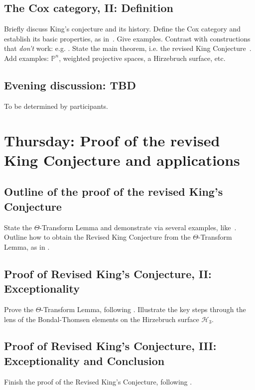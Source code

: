 \documentclass[11pt]{amsart}
\numberwithin{equation}{section}
\theoremstyle{definition}
\theoremstyle{remark}
\newcommand{\PP}{\mathbb P}
\begin{document}
\subsection{The Cox category, II: Definition}
Briefly discuss King's conjecture and its history.
Define the Cox category and establish its basic properties, as in~\cite[\S3]{king}.  Give examples.  Contrast with constructions that \emph{don't} work: e.g. \cite[Remark 4.8]{king}.  State the main theorem, i.e. the revised King Conjecture~\cite[Theorem A]{king}.    Add examples: $\PP^n$, weighted projective spaces, a Hirzebruch surface, etc.
    

\subsection*{Evening discussion: TBD}  To be determined by participants.

\section{Thursday: Proof of the revised King Conjecture and applications}
\subsection{Outline of the proof of the revised King's Conjecture}
State the $\Theta$-Transform Lemma and demonstrate via several examples, like~\cite[\S4.2]{king}.  Outline how to obtain the Revised King Conjecture from the $\Theta$-Transform Lemma, as in \cite[\S1.2]{king}.

\subsection{Proof of Revised King's Conjecture, II: Exceptionality}
Prove the $\Theta$-Transform Lemma, following \cite[\S4.3]{king}.  Illustrate the key steps through the lens of the Bondal-Thomsen elements on the Hirzebruch surface $\mathcal H_3$.

\subsection{Proof of Revised King's Conjecture, III: Exceptionality and Conclusion}
Finish the proof of the Revised King's Conjecture, following \cite[\S4.3 and \S5]{king}.
\end{document}
